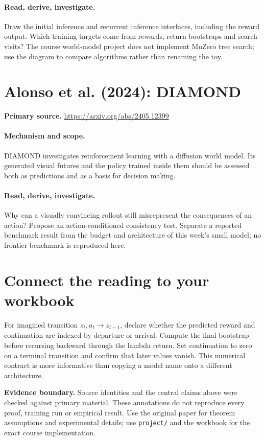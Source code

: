 \documentclass[11pt]{scrartcl}
\begin{document}
\paragraph{Read, derive, investigate.} Draw the initial inference and recurrent inference interfaces, including the reward output. Which training targets come from rewards, return bootstraps and search visits? The course world-model project does not implement MuZero tree search; use the diagram to compare algorithms rather than renaming the toy.

\section{Alonso et al. (2024): DIAMOND}
\noindent\textbf{Primary source.} \url{https://arxiv.org/abs/2405.12399}

\paragraph{Mechanism and scope.} DIAMOND investigates reinforcement learning with a diffusion world model. Its generated visual futures and the policy trained inside them should be assessed both as predictions and as a basis for decision making.

\paragraph{Read, derive, investigate.} Why can a visually convincing rollout still misrepresent the consequences of an action? Propose an action-conditioned consistency test. Separate a reported benchmark result from the budget and architecture of this week's small model; no frontier benchmark is reproduced here.

\section*{Connect the reading to your workbook}
For imagined transition $z_t,a_t\to z_{t+1}$, declare whether the predicted reward and continuation are indexed by departure or arrival. Compute the final bootstrap before recursing backward through the lambda return. Set continuation to zero on a terminal transition and confirm that later values vanish. This numerical contract is more informative than copying a model name onto a different architecture.

\noindent\textbf{Evidence boundary.} Source identities and the central claims above were checked against primary material. These annotations do not reproduce every proof, training run or empirical result. Use the original paper for theorem assumptions and experimental details; use \texttt{project/} and the workbook for the exact course implementation.
\end{document}
